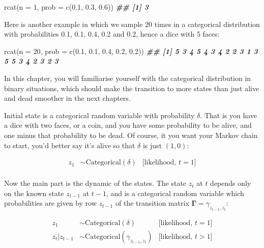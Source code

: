 \documentclass[
  12pt,
]{krantz}
\newenvironment{Shaded}{\begin{snugshade}}{\end{snugshade}}
\newcommand{\AttributeTok}[1]{\textcolor[rgb]{0.77,0.63,0.00}{#1}}
\newcommand{\DecValTok}[1]{\textcolor[rgb]{0.00,0.00,0.81}{#1}}
\newcommand{\DocumentationTok}[1]{\textcolor[rgb]{0.56,0.35,0.01}{\textbf{\textit{#1}}}}
\newcommand{\FloatTok}[1]{\textcolor[rgb]{0.00,0.00,0.81}{#1}}
\newcommand{\FunctionTok}[1]{\textcolor[rgb]{0.00,0.00,0.00}{#1}}
\newcommand{\NormalTok}[1]{#1}
\begin{document}
\begin{Shaded}
\begin{Highlighting}[]
\FunctionTok{rcat}\NormalTok{(}\AttributeTok{n =} \DecValTok{1}\NormalTok{, }\AttributeTok{prob =} \FunctionTok{c}\NormalTok{(}\FloatTok{0.1}\NormalTok{, }\FloatTok{0.3}\NormalTok{, }\FloatTok{0.6}\NormalTok{))}
\DocumentationTok{\#\# [1] 3}
\end{Highlighting}
\end{Shaded}

Here is another example in which we sample 20 times in a categorical distribution with probabilities 0.1, 0.1, 0.4, 0.2 and 0.2, hence a dice with 5 faces:

\begin{Shaded}
\begin{Highlighting}[]
\FunctionTok{rcat}\NormalTok{(}\AttributeTok{n =} \DecValTok{20}\NormalTok{, }\AttributeTok{prob =} \FunctionTok{c}\NormalTok{(}\FloatTok{0.1}\NormalTok{, }\FloatTok{0.1}\NormalTok{, }\FloatTok{0.4}\NormalTok{, }\FloatTok{0.2}\NormalTok{, }\FloatTok{0.2}\NormalTok{))}
\DocumentationTok{\#\#  [1] 5 3 4 5 4 3 4 2 2 3 1 3 5 5 3 4 2 3 2 3}
\end{Highlighting}
\end{Shaded}

In this chapter, you will familiarise yourself with the categorical distribution in binary situations, which should make the transition to more states than just alive and dead smoother in the next chapters.

Initial state is a categorical random variable with probability \(\delta\). That is you have a dice with two faces, or a coin, and you have some probability to be alive, and one minus that probability to be dead. Of course, it you want your Markov chain to start, you'd better say it's alive so that \(\delta\) is just \((1,0)\):

\begin{align*}
   z_1 &\sim \text{Categorical}(\delta) &\text{[likelihood, }t = 1 \text{]}\\
\end{align*}

Now the main part is the dynamic of the states. The state \(z_t\) at \(t\) depends only on the known state \(z_{t-1}\) at \(t-1\), and is a categorical random variable which probabilities are given by row \(z_{t-1}\) of the transition matrix \(\mathbf{\Gamma} = \gamma_{z_{t-1},z_{t}}\):

\begin{align*}
   z_1 &\sim \text{Categorical}(\delta) &\text{[likelihood, }t = 1 \text{]}\\
   z_t | z_{t-1} &\sim \text{Categorical}(\gamma_{z_{t-1},z_{t}}) &\text{[likelihood, }t > 1 \text{]}\\
\end{align*}
\end{document}
